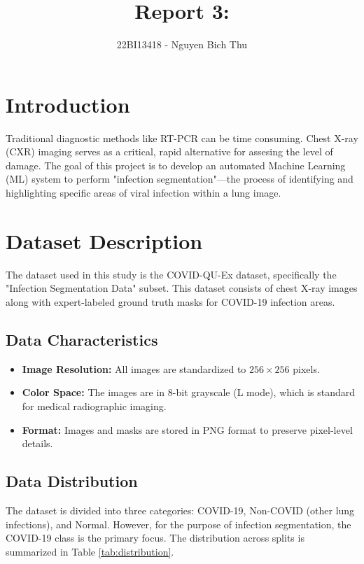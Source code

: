 \documentclass{article}
\title{Report 3: }
\author{22BI13418 - Nguyen Bich Thu}
\begin{document}
\maketitle

\section{Introduction}
Traditional diagnostic methods like RT-PCR can be time consuming. Chest X-ray (CXR) imaging serves as a critical, rapid alternative for assesing the level of damage. The goal of this project is to develop an automated Machine Learning (ML) system to perform "infection segmentation"—the process of identifying and highlighting specific areas of viral infection within a lung image.

\section{Dataset Description}

The dataset used in this study is the COVID-QU-Ex dataset, specifically the "Infection Segmentation Data" subset. This dataset consists of chest X-ray images along with expert-labeled ground truth masks for COVID-19 infection areas.

\subsection{Data Characteristics}
\begin{itemize}
    \item \textbf{Image Resolution:} All images are standardized to $256 \times 256$ pixels.
    \item \textbf{Color Space:} The images are in 8-bit grayscale (L mode), which is standard for medical radiographic imaging.
    \item \textbf{Format:} Images and masks are stored in PNG format to preserve pixel-level details.
\end{itemize}

\subsection{Data Distribution}
The dataset is divided into three categories: COVID-19, Non-COVID (other lung infections), and Normal. However, for the purpose of infection segmentation, the COVID-19 class is the primary focus. The distribution across splits is summarized in Table \ref{tab:distribution}.
\end{document}
